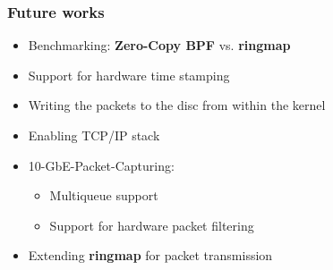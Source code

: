 \begin{frame}
\frametitle{Future works}
\begin{itemize}
	\item Benchmarking:  \textbf{Zero-Copy BPF} vs. \textbf{ringmap}
	\item Support for hardware time stamping
	\item Writing the packets to the disc from within the kernel
	\item Enabling TCP/IP stack
	\item 10-GbE-Packet-Capturing: 
		\begin{itemize}
			\item Multiqueue support 
			\item Support for hardware packet filtering
		\end{itemize}
	\item Extending \textbf{ringmap} for packet transmission 
\end{itemize}
\end{frame}
